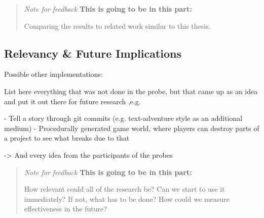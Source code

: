 \blockquote{
\textit{Note for feedback}
\textbf{This is going to be in this part:}

Comparing the results to related work similar to this thesis.

}

\subsection{Relevancy \& Future Implications}

Possible other implementations:

List here everything that was not done in the probe, but that came up as an idea and put it out there for future research ,e.g.

- Tell a story through git commits (e.g. text-adventure style as an additional medium)
- Procedurally generated game world, where players can destroy parts of a project to see what breaks due to that

-> And every idea from the participants of the probes


\blockquote{
\textit{Note for feedback}
\textbf{This is going to be in this part:}

How relevant could all of the research be? Can we start to use it immediately? If not, what has to be done? How could we measure effectiveness in the future?

}